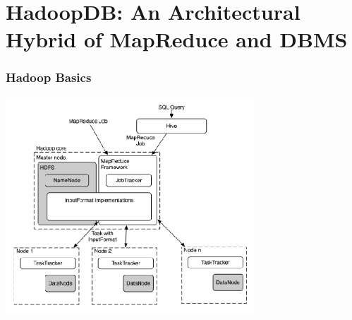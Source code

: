 \documentclass{beamer}
\begin{document}



\section{HadoopDB:  An Architectural Hybrid of MapReduce and DBMS}

\begin{frame}
  \frametitle{Hadoop Basics}
      \begin{center}
      \includegraphics[width=0.7\textwidth]{Hadoop_Basics}
    \end{center}
\end{frame}
\end{document}
